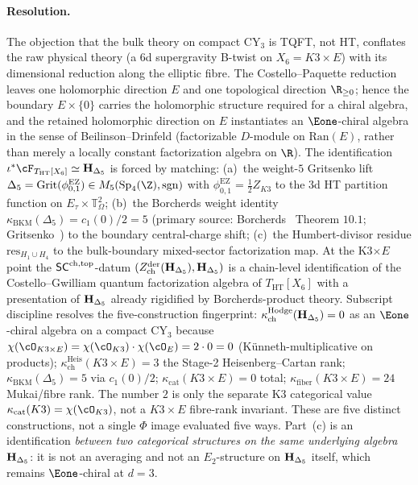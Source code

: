 \paragraph{Resolution.} The objection that the bulk theory
on compact CY$_3$ is TQFT, not HT, conflates the raw physical theory
(a $6$d supergravity B-twist on $X_6=K3\times E$) with its
dimensional reduction along the elliptic fibre. The
Costello--Paquette reduction leaves one holomorphic direction
$E$ and one topological direction $\R_{\geq 0}$; hence the boundary
$E\times\{0\}$ carries the holomorphic structure required for a
chiral algebra, and the retained holomorphic direction
on $E$ instantiates an $\Eone$-chiral algebra in the
sense of Beilinson--Drinfeld (factorizable $D$-module on
$\mathrm{Ran}(E)$, rather than merely a locally constant factorization
algebra on $\R$). The identification
$\iota^*\cF_{T_{\mathrm{HT}}[X_6]}\simeq\HDelta$ is forced by
matching:
(a)~the weight-$5$ Gritsenko lift
\(\Delta_5=\mathrm{Grit}(\phi_{0,1}^{\mathrm{EZ}})\in
M_5(\mathrm{Sp}_4(\Z),\mathrm{sgn})\)
with \(\phi_{0,1}^{\mathrm{EZ}}=\frac12 Z_{K3}\)
to the $3$d HT partition function on
$E_\tau\times\mathbb{T}^2_{\Omega}$;
(b)~the Borcherds weight identity
$\kappa_{\mathrm{BKM}}(\Delta_5)=c_1(0)/2=5$ (primary source:
Borcherds~\cite{Borcherds1995} Theorem $10.1$;
Gritsenko~\cite{Gritsenko1999}) to the boundary central-charge
shift;
(c)~the Humbert-divisor residue $\mathrm{res}_{H_1\cup H_4}$
to the bulk-boundary mixed-sector factorization map.
At the K3$\times E$ point the $\mathsf{SC}^{\mathrm{ch,top}}$-datum
$(Z^{\mathrm{der}}_{\mathrm{ch}}(\mathbf{H}_{\Delta_5}),\mathbf{H}_{\Delta_5})$ is a chain-level
identification of the Costello--Gwilliam quantum factorization
algebra of $T_{\mathrm{HT}}[X_6]$ with a presentation of $\mathbf{H}_{\Delta_5}$
already rigidified by Borcherds-product theory. Subscript
discipline resolves the five-construction fingerprint:
$\kappa_{\mathrm{ch}}^{\mathrm{Hodge}}(\mathbf{H}_{\Delta_5})=0$ as an $\Eone$-chiral algebra on a
compact CY$_3$ because $\chi(\cO_{K3\times E})=\chi(\cO_{K3})\cdot
\chi(\cO_E)=2\cdot 0=0$ (Künneth-multiplicative on products);
$\kappa_{\mathrm{ch}}^{\mathrm{Heis}}(K3\times E)=3$ the Stage-2 Heisenberg--Cartan rank;
$\kappa_{\mathrm{BKM}}(\Delta_5)=5$ via $c_1(0)/2$;
$\kappa_{\mathrm{cat}}(K3\times E)=0$ total;
$\kappa_{\mathrm{fiber}}(K3\times E)=24$ Mukai/fibre rank. The
number $2$ is only the separate K3 categorical value
$\kappa_{\mathrm{cat}}(K3)=\chi(\cO_{K3})$, not a $K3\times E$
fibre-rank invariant. These are five distinct
constructions, not a single $\Phi$ image evaluated five ways.
Part~(c) is an identification \emph{between two categorical
structures on the same underlying algebra} $\mathbf{H}_{\Delta_5}$: it is not
an averaging and not an $E_2$-structure on $\mathbf{H}_{\Delta_5}$ itself, which
remains $\Eone$-chiral at $d=3$.

